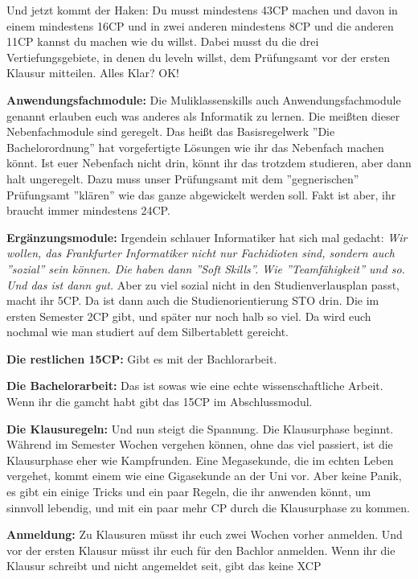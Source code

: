 Und jetzt kommt der Haken: Du musst mindestens 43CP machen und davon in einem
mindestens 16CP und in zwei anderen mindestens 8CP und die anderen 11CP kannst
du machen wie du willst. Dabei musst du die drei Vertiefungsgebiete, in denen
du leveln willst, dem Pr\"ufungsamt vor der ersten Klausur mitteilen. Alles
Klar? OK!

\textbf{Anwendungsfachmodule:}
Die Muliklassenskills auch Anwendungsfachmodule genannt erlauben euch was anderes als Informatik zu lernen.
Die mei{\ss}ten dieser Nebenfachmodule sind geregelt. Das hei{\ss}t das
Basisregelwerk ''Die Bachelorordnung'' hat vorgefertigte L\"osungen wie ihr das
Nebenfach machen k\"onnt. Ist euer Nebenfach nicht drin, k\"onnt ihr das trotzdem studieren, aber dann halt ungeregelt.
Dazu muss unser Pr\"ufungsamt mit dem ''gegnerischen'' Pr\"ufungsamt ''kl\"aren'' wie das ganze abgewickelt werden soll.
Fakt ist aber, ihr braucht immer mindestens 24CP.

\textbf{Erg\"anzungsmodule:}
Irgendein schlauer Informatiker hat sich mal gedacht: \emph{Wir wollen, das
Frankfurter Informatiker nicht nur Fachidioten sind, sondern auch ''sozial''
sein k\"onnen. Die haben dann ''Soft Skills''. Wie ''Teamf\"ahigkeit'' und so. Und das
ist dann gut.} Aber zu viel sozial nicht in den Studienverlausplan passt, macht ihr 5CP.
Da ist dann auch die Studienorientierung STO drin. Die im ersten Semester 2CP gibt, und sp\"ater nur noch halb so viel.
Da wird euch nochmal wie man studiert auf dem Silbertablett gereicht.

\textbf{Die restlichen 15CP:}
Gibt es mit der Bachlorarbeit.

\textbf{Die Bachelorarbeit:}
Das ist sowas wie eine echte wissenschaftliche Arbeit. Wenn ihr die gamcht habt gibt das 15CP im Abschlussmodul.

\textbf{Die Klausuregeln:}
Und nun steigt die Spannung. Die Klausurphase beginnt.
W\"ahrend im Semester Wochen vergehen k\"onnen, ohne das viel passiert, ist die Klausurphase eher wie Kampfrunden.
Eine Megasekunde, die im echten Leben vergehet, kommt einem wie eine Gigasekunde an der Uni vor.
Aber keine Panik, es gibt ein einige Tricks und ein paar Regeln, die ihr
anwenden k\"onnt, um sinnvoll lebendig, und mit ein paar mehr CP durch die
Klausurphase zu kommen.

\textbf{Anmeldung:}
Zu Klausuren m\"usst ihr euch zwei Wochen vorher anmelden. Und vor der ersten Klausur m\"usst ihr euch f\"ur den Bachlor anmelden.
Wenn ihr die Klausur schreibt und nicht angemeldet seit, gibt das keine XCP

